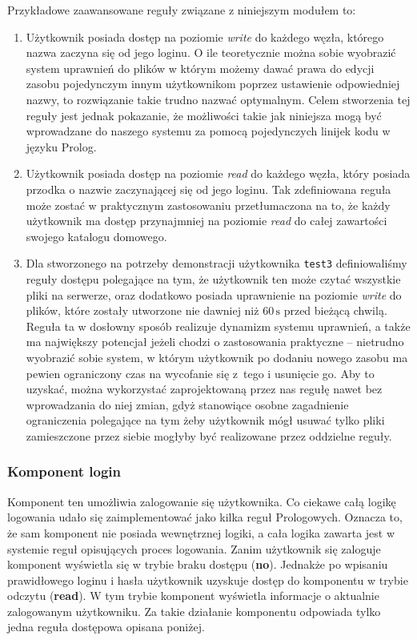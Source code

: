 \documentclass{classrep}
\begin{document}
Przykładowe zaawansowane reguły związane z niniejszym modułem to:
\begin{enumerate}
\item Użytkownik posiada dostęp na poziomie \emph{write} do każdego
węzła, którego nazwa zaczyna się od jego loginu. O ile teoretycznie
można sobie wyobrazić system uprawnień
do plików w którym możemy dawać prawa do edycji zasobu pojedynczym
innym użytkownikom poprzez ustawienie odpowiedniej nazwy, to
rozwiązanie takie trudno nazwać optymalnym. Celem stworzenia tej
reguły jest jednak pokazanie, że możliwości takie jak niniejsza
mogą być wprowadzane do naszego systemu za pomocą pojedynczych
linijek kodu w języku Prolog.

\item Użytkownik posiada dostęp na poziomie \emph{read} do każdego 
węzła, który posiada przodka o nazwie zaczynającej się od jego loginu.
Tak zdefiniowana reguła może zostać w praktycznym zastosowaniu przetłumaczona
na to, że każdy użytkownik ma dostęp przynajmniej na poziomie \emph{read}
do całej zawartości swojego katalogu domowego.

\item Dla stworzonego na potrzeby demonstracji użytkownika \texttt{test3}
definiowaliśmy reguły dostępu polegające na tym, że użytkownik ten
może czytać wszystkie pliki na serwerze, oraz dodatkowo posiada
uprawnienie na poziomie \emph{write} do plików, które zostały utworzone
nie dawniej niż \(60\,\mbox{s}\) przed bieżącą chwilą. Reguła ta
w dosłowny sposób realizuje dynamizm systemu uprawnień, a także
ma największy potencjał jeżeli chodzi o zastosowania praktyczne --
nietrudno wyobrazić sobie system, w którym użytkownik po dodaniu
nowego zasobu ma pewien ograniczony czas na wycofanie się z~tego
i usunięcie go. Aby to uzyskać, można wykorzystać zaprojektowaną
przez nas regułę nawet bez wprowadzania do niej zmian, gdyż
stanowiące osobne zagadnienie ograniczenia
polegające na tym żeby użytkownik mógł usuwać tylko pliki
zamieszczone przez siebie mogłyby być realizowane przez
oddzielne reguły.
\end{enumerate}

\subsubsection{Komponent login}
Komponent ten umożliwia zalogowanie się użytkownika. Co ciekawe całą logikę logowania udało się zaimplementować jako kilka reguł Prologowych. Oznacza to, że sam komponent nie posiada
wewnętrznej logiki, a cała logika zawarta jest w systemie reguł opisujących proces logowania. 
Zanim użytkownik się zaloguje komponent wyświetla się w trybie braku dostępu (\textbf{no}). Jednakże po wpisaniu prawidłowego loginu i hasła użytkownik uzyskuje dostęp do komponentu
w trybie odczytu (\textbf{read}). W tym trybie komponent wyświetla informacje o aktualnie zalogowanym użytkowniku. Za takie działanie komponentu odpowiada tylko jedna reguła dostępowa
opisana poniżej.
\end{document}
